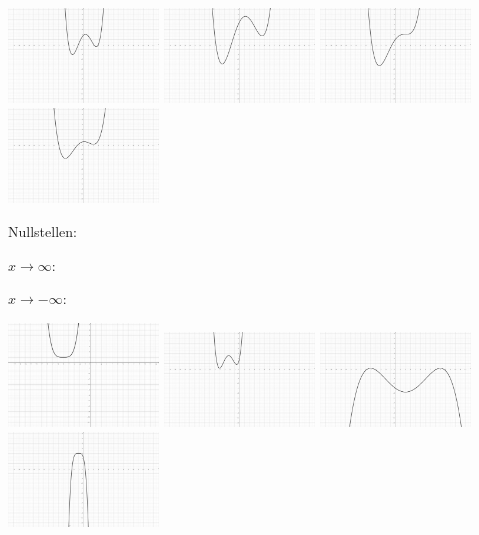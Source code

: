 \documentclass[12pt, parskip=half, a4paper, oneside]{scrartcl}
\begin{document}
\includegraphics[width=4cm]{Bilder/G41}\hfill
\includegraphics[width=4cm]{Bilder/G42}\hfill
\includegraphics[width=4cm]{Bilder/G43}\hfill
\includegraphics[width=4cm]{Bilder/G44}

\begin{addmargin}[-2cm]{0pt}
Nullstellen:

$x\rightarrow\infty:$

$x\rightarrow-\infty:$
\end{addmargin}

\includegraphics[width=4cm]{Bilder/G45}\hfill
\includegraphics[width=4cm]{Bilder/G46}\hfill
\includegraphics[width=4cm]{Bilder/G47}\hfill
\includegraphics[width=4cm]{Bilder/G48}
\end{document}

